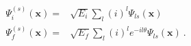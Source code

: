 \begin{equation}
\begin{array}{ll}
\Psi _{i}^{\left( s\right) }(\mathbf{x})= & \sqrt{E_{i}} \sum_{l}\left( i\right) ^{l}\Psi
_{ls}(\mathbf{x}) \\
\Psi _{f}^{\left( s\right) }(\mathbf{x})= & \sqrt{E_{f}} \sum_{l}\left( i\right)
^{l}e^{-il\theta }\Psi _{ls}(\mathbf{x})\ .
\end{array}
\end{equation}

